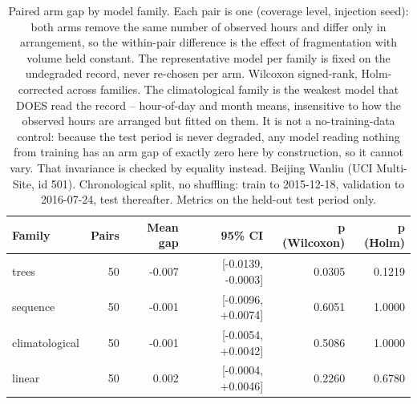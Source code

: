 \begin{table}[htbp]
\caption{Paired arm gap by model family. Each pair is one (coverage level, injection seed): both arms remove the same number of observed hours and differ only in arrangement, so the within-pair difference is the effect of fragmentation with volume held constant. The representative model per family is fixed on the undegraded record, never re-chosen per arm. Wilcoxon signed-rank, Holm-corrected across families. The climatological family is the weakest model that DOES read the record -- hour-of-day and month means, insensitive to how the observed hours are arranged but fitted on them. It is not a no-training-data control: because the test period is never degraded, any model reading nothing from training has an arm gap of exactly zero here by construction, so it cannot vary. That invariance is checked by equality instead. Beijing Wanliu (UCI Multi-Site, id 501). Chronological split, no shuffling: train to 2015-12-18, validation to 2016-07-24, test thereafter. Metrics on the held-out test period only.}
\label{tab:ablation_paired_test}
\begin{tabular}{lrrrrr}
\toprule
Family & Pairs & Mean gap & 95\% CI & p (Wilcoxon) & p (Holm) \\
\midrule
trees & 50 & -0.007 & [-0.0139, -0.0003] & 0.0305 & 0.1219 \\
sequence & 50 & -0.001 & [-0.0096, +0.0074] & 0.6051 & 1.0000 \\
climatological & 50 & -0.001 & [-0.0054, +0.0042] & 0.5086 & 1.0000 \\
linear & 50 & 0.002 & [-0.0004, +0.0046] & 0.2260 & 0.6780 \\
\bottomrule
\end{tabular}
\end{table}
